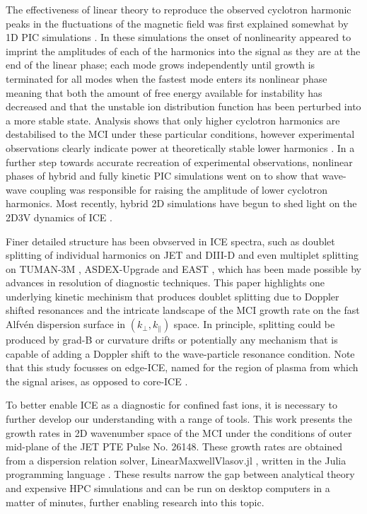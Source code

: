 \documentclass[12pt]{iopart}
\begin{document}
The effectiveness of linear theory to reproduce the observed cyclotron
harmonic peaks in the fluctuations of the magnetic field was first explained
somewhat by 1D PIC simulations \cite{Cook2013}.
In these simulations the onset of nonlinearity
appeared to imprint the amplitudes of each of the harmonics into the signal as
they are at the end of the linear phase; each mode grows independently until 
growth is terminated for all modes when the fastest mode enters its nonlinear
phase meaning that both the amount of free energy available for instability has
decreased and that the unstable ion distribution function has been
perturbed into a more stable state. Analysis shows that only higher cyclotron
harmonics are destabilised \cite{McClements2015} to the MCI under these
particular conditions, however experimental
observations clearly indicate power at theoretically stable lower
harmonics \cite{Cottrell1988}. In a further step towards accurate recreation of
experimental observations, nonlinear phases of hybrid \cite{Carbajal2014} and
fully kinetic \cite{Cook2013,Chapman2017} PIC simulations went on to show that
wave-wave coupling was responsible for raising the amplitude of lower cyclotron
harmonics. Most recently, hybrid 2D simulations have begun to shed light on the
2D3V dynamics of ICE \cite{Carbajal2021}.

Finer detailed structure has been obvserved in ICE spectra, such as doublet
splitting of individual harmonics on JET \cite{Cottrell1993} and
DIII-D \cite{Thome2018} and even multiplet splitting on TUMAN-3M \cite{Askinazi2018},
ASDEX-Upgrade \cite{Ochoukov2019} and EAST \cite{Liu2020}, which has been made
possible by advances in resolution of diagnostic techniques.
This paper highlights one underlying kinetic mechinism that produces
doublet splitting due to Doppler shifted resonances and the
intricate landscape of the MCI growth rate on the fast Alfv{\'e}n dispersion
surface in $(k_\bot, k_\parallel)$ space.
In principle, splitting could be produced by grad-B or curvature
drifts \cite{Cottrell1993,Fulop1998} or potentially any mechanism that is capable
of adding a Doppler shift to the wave-particle resonance condition. Note that
this study focusses on edge-ICE, named for the region of plasma from which the signal
arises, as opposed to core-ICE \cite{Ochoukov2018, Liu2020}. 

To better enable ICE as a diagnostic for confined fast ions, it is necessary to
further develop our understanding with a range of tools. This work presents
the growth rates in 2D wavenumber space of the MCI under the conditions of
outer mid-plane of the JET PTE \cite{Cottrell1993} Pulse No. 26148. These growth
rates are obtained from a dispersion relation solver,
LinearMaxwellVlasov.jl \cite{LinearMaxwellVlasov.jl}, written in the Julia programming
language \cite{Bezanson2017}. These results narrow the gap between analytical
theory and expensive HPC simulations and can be run on desktop computers
in a matter of minutes, further enabling research into this topic.
\end{document}
